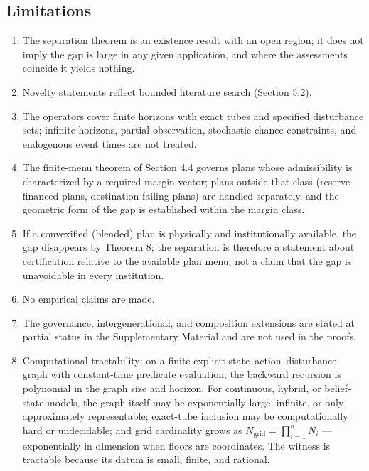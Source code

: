 \documentclass[review,11pt]{elsarticle}
\providecommand{\tightlist}{\setlength{\itemsep}{0pt}\setlength{\parskip}{0pt}}
\begin{document}
\subsection{Limitations}\label{limitations}

\begin{enumerate}
\def\labelenumi{(\roman{enumi})}
\tightlist
\item
  The separation theorem is an existence result with an open region; it does not imply the gap is large in any given application, and where the assessments coincide it yields nothing.
\item
  Novelty statements reflect bounded literature search (Section 5.2).
\item
  The operators cover finite horizons with exact tubes and specified disturbance sets; infinite horizons, partial observation, stochastic chance constraints, and endogenous event times are not treated.
\item
  The finite-menu theorem of Section 4.4 governs plans whose admissibility is characterized by a required-margin vector; plans outside that class (reserve-financed plans, destination-failing plans) are handled separately, and the geometric form of the gap is established within the margin class.
\item
  If a convexified (blended) plan is physically and institutionally available, the gap disappears by Theorem 8; the separation is therefore a statement about certification relative to the available plan menu, not a claim that the gap is unavoidable in every institution.
\item
  No empirical claims are made.
\item
  The governance, intergenerational, and composition extensions are stated at partial status in the Supplementary Material and are not used in the proofs.
\item
  Computational tractability: on a finite explicit state--action--disturbance graph with constant-time predicate evaluation, the backward recursion is polynomial in the graph size and horizon. For continuous, hybrid, or belief-state models, the graph itself may be exponentially large, infinite, or only approximately representable; exact-tube inclusion may be computationally hard or undecidable; and grid cardinality grows as \(N_{\mathrm{grid}} = \prod_{i=1}^n N_i\) --- exponentially in dimension when floors are coordinates. The witness is tractable because its datum is small, finite, and rational.
\end{enumerate}
\end{document}
